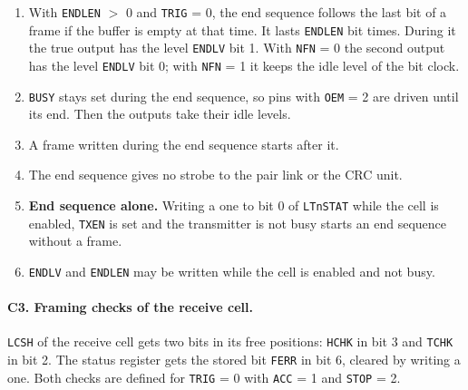 \documentclass[10pt,a4paper]{article}
\newcommand{\reg}[1]{\texttt{#1}}
\begin{document}
\begin{enumerate}[label=\textbf{E\arabic*},leftmargin=2.6em]
\item With \reg{ENDLEN} $>$ 0 and \reg{TRIG} = 0, the end sequence follows the last bit of a frame if the buffer is
empty at that time. It lasts \reg{ENDLEN} bit times. During it the true output has the level \reg{ENDLV} bit 1.
With \reg{NFN} = 0 the second output has the level \reg{ENDLV} bit 0; with \reg{NFN} = 1 it keeps the idle level
of the bit clock.
\item \reg{BUSY} stays set during the end sequence, so pins with \reg{OEM} = 2 are driven until its end. Then the
outputs take their idle levels.
\item A frame written during the end sequence starts after it.
\item The end sequence gives no strobe to the pair link or the CRC unit.
\item \textbf{End sequence alone.} Writing a one to bit 0 of \reg{LTnSTAT} while the cell is enabled, \reg{TXEN} is
set and the transmitter is not busy starts an end sequence without a frame.
\item \reg{ENDLV} and \reg{ENDLEN} may be written while the cell is enabled and not busy.
\end{enumerate}

\paragraph{C3. Framing checks of the receive cell.} \reg{LCSH} of the receive cell gets two bits in its free
positions: \reg{HCHK} in bit 3 and \reg{TCHK} in bit 2. The status register gets the stored bit \reg{FERR} in bit 6,
cleared by writing a one. Both checks are defined for \reg{TRIG} = 0 with \reg{ACC} = 1 and \reg{STOP} = 2.
\end{document}
